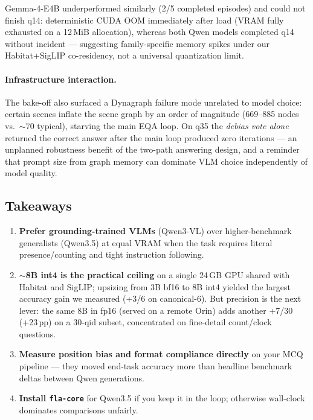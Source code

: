 Gemma-4-E4B underperformed similarly (2/5 completed episodes) and could not finish q14:
deterministic CUDA OOM immediately after load (VRAM fully exhausted on a 12\,MiB
allocation), whereas both Qwen models completed q14 without incident --- suggesting
family-specific memory spikes under our Habitat+SigLIP co-residency, not a universal
quantization limit.

\paragraph{Infrastructure interaction.}
The bake-off also surfaced a Dynagraph failure mode unrelated to model choice: certain
scenes inflate the scene graph by an order of magnitude (669--885 nodes vs.\ $\sim$70
typical), starving the main EQA loop. On q35 the \emph{debias vote alone} returned the
correct answer after the main loop produced zero iterations --- an unplanned robustness
benefit of the two-path answering design, and a reminder that prompt size from graph
memory can dominate VLM choice independently of model quality.

\subsection{Takeaways}

\begin{enumerate}
  \item \textbf{Prefer grounding-trained VLMs} (Qwen3-VL) over higher-benchmark
  generalists (Qwen3.5) at equal VRAM when the task requires literal presence/counting
  and tight instruction following.
  \item \textbf{$\sim$8B int4 is the practical ceiling} on a single 24\,GB GPU shared with
  Habitat and SigLIP; upsizing from 3B bf16 to 8B int4 yielded the largest accuracy gain
  we measured (+3/6 on canonical-6). But precision is the next lever: the same 8B in fp16
  (served on a remote Orin) adds another +7/30 (+23\,pp) on a 30-qid subset, concentrated
  on fine-detail count/clock questions.
  \item \textbf{Measure position bias and format compliance directly} on your MCQ pipeline
  --- they moved end-task accuracy more than headline benchmark deltas between Qwen
  generations.
  \item \textbf{Install \texttt{fla-core}} for Qwen3.5 if you keep it in the loop; otherwise
  wall-clock dominates comparisons unfairly.
\end{enumerate}
